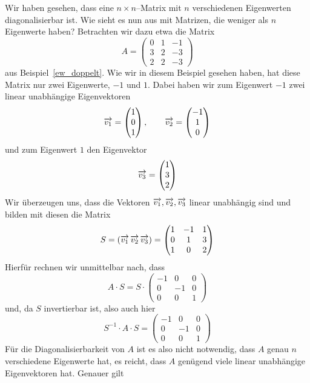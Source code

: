 Wir haben gesehen, dass eine $n \times n$--Matrix mit $n$ verschiedenen Eigenwerten 
diagonalisierbar ist. Wie sieht es nun aus mit Matrizen, die weniger als $n$ Eigenwerte 
haben? Betrachten wir dazu etwa die Matrix 
  	$$ A = \left( \begin{matrix} 0 & 1 & - 1 \\ 3 & 2 & - 3 \\ 2 & 2 & - 3
 	\end{matrix} \right) $$
aus Beispiel~\ref{ew_doppelt}. Wie wir in diesem Beispiel gesehen haben, hat diese Matrix 
nur zwei Eigenwerte, $-1$ und $1$. Dabei haben wir zum Eigenwert $-1$ zwei linear 
unabhängige Eigenvektoren 
  	$$ \overrightarrow{v_1} = \left( \begin{matrix} 1 \\ 0 \\ 1 \end{matrix} \right), 
  	\qquad \overrightarrow{v_2} = \left( \begin{matrix} -1 \\ 1 \\ 0 \end{matrix} \right) $$
und zum Eigenwert $1$ den Eigenvektor
  	$$ \overrightarrow{v_3} = \left( \begin{matrix} 1 \\ 3 \\ 2 \end{matrix} \right) $$
Wir überzeugen uns, dass die Vektoren $\overrightarrow{v_1}, \overrightarrow{v_2}, 
\overrightarrow{v_3}$ linear unabhängig sind und bilden mit diesen die Matrix 
  	$$ S = \left( \overrightarrow{v_1} \, \overrightarrow{v_2} \, \overrightarrow{v_3} \right) 
	= \left( \begin{matrix} 1 & -1 & 1 \\ 0 & 1 & 3 \\ 1 & 0 & 2 \end{matrix} \right) $$
Hierfür rechnen wir unmittelbar nach, dass
  	$$ A \cdot S = S \cdot \left( \begin{matrix} -1 & 0 & 0 \\ 0 & -1 & 0 \\ 0 & 0 & 1 \end{matrix} \right) $$
und, da $S$ invertierbar ist, also auch hier
  	$$ S^{-1} \cdot A \cdot S = \left( \begin{matrix} -1 & 0 & 0 \\ 0 & -1 & 0 \\ 0 & 0 & 1 \end{matrix} \right) $$
Für die Diagonalisierbarkeit von $A$ ist es also nicht notwendig, dass $A$ genau 
$n$ verschiedene Eigenwerte hat, es reicht, dass $A$ genügend viele linear 
unabhängige Eigenvektoren hat. Genauer gilt

